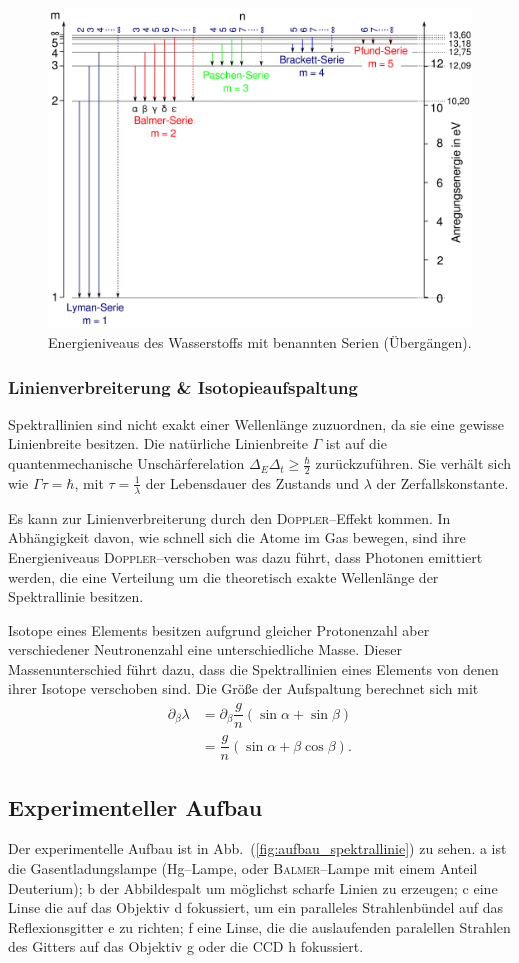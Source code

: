 \documentclass[sn-mathphys-num,iicol]{sn-jnl}
\theoremstyle{thmstyleone}
\theoremstyle{thmstyletwo}
\theoremstyle{thmstylethree}
\begin{document}
\begin{figure}[t]
        \centering
        \includegraphics[width=.5\textwidth]{402_serien.png}
        \caption{Energieniveaus des Wasserstoffs mit benannten Serien (Übergängen).\cite{WikipediaSerien}} \label{fig:serien}
\end{figure}

\subsubsection{Linienverbreiterung \& Isotopieaufspaltung}
Spektrallinien sind nicht exakt einer Wellenlänge zuzuordnen, da sie eine gewisse Linienbreite besitzen.
Die natürliche Linienbreite $\Gamma $ ist auf die quantenmechanische Unschärferelation $\Delta _E\Delta _t \geq \tfrac{\hbar }{2}$ zurückzuführen.
Sie verhält sich wie $\Gamma \tau =\hbar $, mit $\tau =\tfrac{1}{\lambda }$ der Lebensdauer des Zustands und $\lambda $ der Zerfallskonstante.

Es kann zur Linienverbreiterung durch den \textsc{Doppler}--Effekt kommen.
In Abhängigkeit davon, wie schnell sich die Atome im Gas bewegen, sind ihre Energieniveaus \textsc{Doppler}--verschoben was dazu führt, dass Photonen emittiert werden, die eine Verteilung um die theoretisch exakte Wellenlänge der Spektrallinie besitzen.

Isotope eines Elements besitzen aufgrund gleicher Protonenzahl aber verschiedener Neutronenzahl eine unterschiedliche Masse.
Dieser Massenunterschied führt dazu, dass die Spektrallinien eines Elements von denen ihrer Isotope verschoben sind.
Die Größe der Aufspaltung berechnet sich mit 
\begin{align} 
         &&&& \partial _\beta \lambda  &= \partial _\beta\dfrac{g}{n}\left(\sin \alpha +\sin \beta \right)  &&&& \\
          &&&&  &= \dfrac{g}{n}\left(\sin \alpha +\beta \cos \beta \right).  &&&& 
\end{align} 

\subsection{Experimenteller Aufbau}
Der experimentelle Aufbau ist in Abb.\ (\ref{fig:aufbau_spektrallinie}) zu sehen.
a ist die Gasentladungslampe (Hg--Lampe, oder \textsc{Balmer}--Lampe mit einem Anteil Deuterium); b der Abbildespalt um möglichst scharfe Linien zu erzeugen; c eine Linse die auf das Objektiv d fokussiert, um ein paralleles Strahlenbündel auf das Reflexionsgitter e zu richten; f eine Linse, die die auslaufenden paralellen Strahlen des Gitters auf das Objektiv g oder die CCD h fokussiert.
\end{document}
